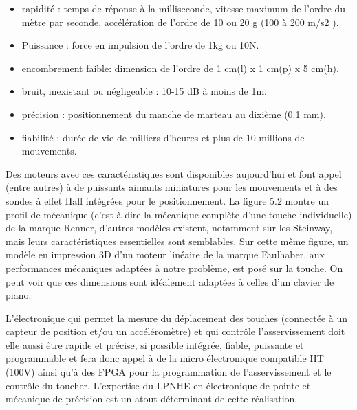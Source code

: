 \documentclass[french,a4paper,12pt]{report}
\begin{document}
\begin{itemize}
	\item  rapidité : temps de réponse à la milliseconde, vitesse maximum de l’ordre du mètre par
	seconde, accélération de l’ordre de 10 ou 20 g (100 à 200 m/s2 ).

	\item Puissance : force en impulsion de l'ordre de 1kg ou 10N.

	\item encombrement faible: dimension de l'ordre de 1 cm(l) x 1 cm(p) x 5 cm(h).

	\item bruit, inexistant ou négligeable : 10-15 dB à moins de 1m.

	\item précision : positionnement du manche de marteau au dixième (0.1 mm).

	\item fiabilité : durée de vie de milliers d'heures et plus de 10 millions de mouvements.
\end{itemize}

Des moteurs avec ces caractéristiques sont disponibles aujourd’hui et font appel (entre autres) à de puissants aimants miniatures pour les mouvements et à des sondes à effet Hall intégrées pour le positionnement. La figure 5.2 montre un profil de mécanique (c’est à dire la mécanique complète d’une touche individuelle) de la marque Renner, d’autres modèles existent, notamment sur les Steinway, mais leurs caractéristiques essentielles sont semblables. Sur cette même figure, un modèle en impression 3D d’un moteur linéaire de la marque Faulhaber, aux performances mécaniques adaptées à notre problème, est posé sur la touche. On peut voir que ces dimensions sont idéalement adaptées à celles d’un clavier de piano.

L’électronique qui permet la mesure du déplacement des touches (connectée à un capteur de position et/ou un accéléromètre) et qui contrôle l’asservissement doit elle aussi être rapide et précise, si possible intégrée, fiable, puissante et programmable et fera donc appel à de la micro électronique compatible HT (100V) ainsi qu’à des FPGA pour la programmation de l’asservissement et le contrôle du toucher. L’expertise du LPNHE en électronique de pointe et mécanique de précision est un atout déterminant de cette réalisation.
\end{document}
